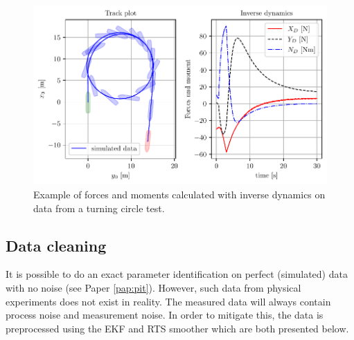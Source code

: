 \begin{figure}[H]
    \centering
    \includegraphics[width=\textwidth]{kappa/images/1.pdf}
    \caption{Example of forces and moments calculated with inverse dynamics on data from a turning circle test.}
    \label{\detokenize{03.01_inverse_dynamics:fig-inverse}}
\end{figure}

\subsection{Data cleaning}
\label{sec:datacleaning}
It is possible to do an exact parameter identification on perfect (simulated) data with no noise (see Paper \ref{pap:pit}). However, such data from physical experiments does not exist in reality. The measured data will always contain process noise and measurement noise. In order to mitigate this, the data is preprocessed using the EKF and RTS smoother which are both presented below.

